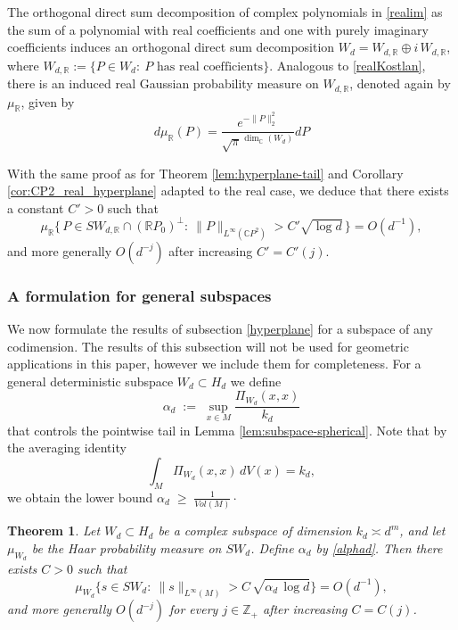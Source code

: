 \documentclass [11pt]{amsart}
\newtheorem {theorem}{Theorem}
\theoremstyle{remark}
\numberwithin{equation}{section}
\numberwithin{theorem}{section}
\begin{document}
The orthogonal direct sum decomposition of complex polynomials in \eqref{realim} as the sum of a polynomial with real
coefficients and one with purely imaginary coefficients induces an orthogonal direct sum decomposition 
$W_d = W_{d,\mathbb{R}} \oplus i\,W_{d,\mathbb{R}}$,
where
$
W_{d,\mathbb{R}}:=\{P\in W_d:\ P \text{ has real coefficients}\}.
$
Analogous to \eqref{realKostlan}, there is an induced real Gaussian probability measure on 
$W_{d,\mathbb{R}}$, denoted again by $\mu_{\mathbb{R}}$, given by 
\begin{equation}
d\mu_{\mathbb{R}}(P)=\frac{e^{-\|P\|^2_{2}}}{\sqrt{\pi}^{\dim_{\mathbb{C}}(W_{d})}}dP 
\end{equation} 

\noindent With the same proof as for Theorem \ref{lem:hyperplane-tail} and Corollary \ref{cor:CP2_real_hyperplane} adapted to the real case, we deduce that there exists a constant $C'>0$ such that
\begin{equation}
\mu_{\mathbb{R}}\Big\{\,P\in SW_{d,\mathbb{R}}\cap (\mathbb{R}P_0)^\perp:
\ \|P\|_{L^\infty(\mathbb{C}P^2)}
> C'\sqrt{\log d}\,\Big\}
=O(d^{-1}),
\end{equation}
and more generally $O(d^{-j})$ after increasing $C'=C'(j)$.




\subsubsection{A formulation for general subspaces} We now formulate the results of subsection \ref{hyperplane} for a subspace of any codimension. The results of this subsection will not be used for geometric applications in this paper, however we include them for completeness.
For a general deterministic subspace $W_d\subset H_d$ we define
 \begin{equation}\label{alphad}
\alpha_d \;:=\; \sup_{x\in M}\frac{\Pi_{W_d}(x,x)}{k_d}
\end{equation}
that controls the pointwise tail in Lemma \ref{lem:subspace-spherical}. Note that by the averaging identity
\[
\int_M \Pi_{W_d}(x,x)\,dV(x)=k_d,
\]
we obtain the lower bound
$\displaystyle{
\alpha_d \;\ge\; \frac{1}{Vol(M)}\cdot
}$


\begin{theorem}\label{thm:alpha}
Let $W_d\subset H_d$ be a complex subspace of dimension $k_d\asymp d^m$, and let
$\mu_{W_d}$ be the Haar probability measure on $SW_d$.
Define $\alpha_{d}$ by \eqref{alphad}.
Then there exists $C>0$ such that
\[
\mu_{W_d}\Big\{s\in SW_d:\ \|s\|_{L^\infty(M)} > C\,\sqrt{\alpha_d\,\log d}\Big\}
=O(d^{-1}),
\]
and more generally $O(d^{-j})$ for every $j\in\mathbb{Z}_+$ after increasing $C=C(j)$.
\end{theorem}
\end{document}
